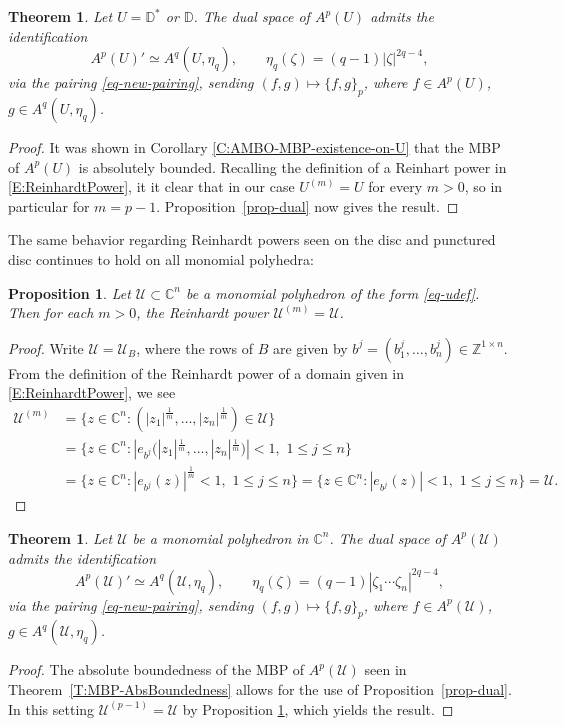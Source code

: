 \documentclass[letterpaper,11pt,reqno]{amsart}
\theoremstyle{plain}
\newtheorem{theorem}[equation]{Theorem}
\newtheorem{proposition}[equation]{Proposition}
\theoremstyle{definition}
\theoremstyle{remark}
\theoremstyle{remark}
\numberwithin{equation}{section}
\newcommand{\C}{{\mathbb C}}
\newcommand{\D}{{\mathbb D}}
\newcommand{\Z}{{\mathbb Z}}
\newcommand{\Uu}{\mathscr{U}}
\begin{document}
\begin{theorem}\label{T:dual-space-on-U}
Let $U = \D^*$ or $\D$. The dual space of $A^p(U)$ admits the identification
\[
A^p(U)' \simeq A^q(U,\eta_q),\qquad \eta_q(\zeta) = (q-1)|\zeta|^{2q-4},
\]
via the pairing \eqref{eq-new-pairing}, sending $(f,g) \mapsto \{f,g\}_p$, where $f \in A^p(U)$, $g \in A^q(U,\eta_q)$.
\end{theorem}
\begin{proof}
It was shown in Corollary \ref{C:AMBO-MBP-existence-on-U} that the MBP of $A^p(U)$ is absolutely bounded.
Recalling the definition of a Reinhart power in \eqref{E:ReinhardtPower}, it it clear that in our case $U^{(m)} = U$ for every $m>0$, so in particular for $m = p-1$.  Proposition~\ref{prop-dual} now gives the result.
\end{proof}

The same behavior regarding Reinhardt powers seen on the disc and punctured disc continues to hold on all monomial polyhedra:
\begin{proposition}\label{P:Reinhart-powers-monomial-polys}
Let $\Uu \subset \C^n$ be a monomial polyhedron of the form \eqref{eq-udef}.  Then for each $m>0$, the Reinhardt power $\Uu^{(m)} = \Uu$.
\end{proposition}
\begin{proof}
Write $\Uu = \Uu_B$, where the rows of $B$ are given by $b^j = (b^j_1,\dots,b_n^j) \in \Z^{1 \times n}$.  
From the definition of the Reinhardt power of a domain given in \eqref{E:ReinhardtPower}, we see
\begin{align*}
\Uu^{(m)} &= \{ z \in \C^n : (|z_1|^{\frac{1}{m}},\dots,|z_n|^{\frac{1}{m}}) \in \Uu \} \\
&= \{ z \in \C^n : |e_{b^j}\big(|z_1|^{\frac{1}{m}},\dots,|z_n|^{\frac{1}{m}}\big)| < 1, \,\, 1 \le j \le n \} \\
&= \big\{ z \in \C^n : |e_{b^j}(z) |^{\frac{1}{m}} < 1, \,\, 1 \le j \le n \big\} 
= \big\{ z \in \C^n : |e_{b^j}(z) | < 1, \,\, 1 \le j \le n \big\} = \Uu.
\end{align*}
\end{proof}

\begin{theorem}\label{T:MBP-duality-pairing} 
Let $\Uu$ be a monomial polyhedron in $\C^n$. The dual space of $A^p(\Uu)$ admits the identification
\[
A^p(\Uu)' \simeq A^q(\Uu,\eta_q),\qquad \eta_q(\zeta) = (q-1)|\zeta_1\cdots\zeta_n|^{2q-4},
\]
via the pairing \eqref{eq-new-pairing}, sending $(f,g) \mapsto \{f,g\}_p$, where $f \in A^p(\Uu)$, $g \in A^q(\Uu,\eta_q)$.
\end{theorem}
\begin{proof}
The absolute boundedness of the MBP of $A^p(\Uu)$ seen in Theorem~\ref{T:MBP-AbsBoundedness} allows for the use of Proposition~\ref{prop-dual}. 
In this setting $\Uu^{(p-1)} = \Uu$ by Proposition \ref{P:Reinhart-powers-monomial-polys}, which yields the result.
\end{proof}
\end{document}
